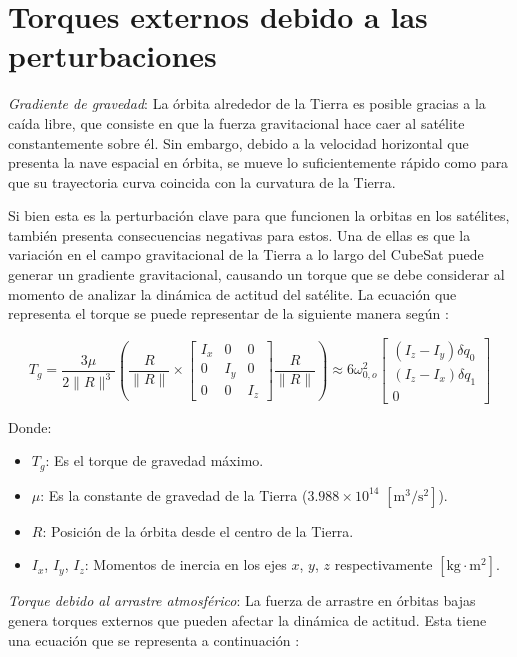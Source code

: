 \section{Torques externos debido a las perturbaciones}

\label{ap:Z2}


\textit{Gradiente de gravedad}: La órbita alrededor de la Tierra es posible gracias a la caída libre, que consiste en que la fuerza gravitacional hace caer al satélite constantemente sobre él. Sin embargo, debido a la velocidad horizontal que presenta la nave espacial en órbita, se mueve lo suficientemente rápido como para que su trayectoria curva coincida con la curvatura de la Tierra.

Si bien esta es la perturbación clave para que funcionen la orbitas en los satélites, también presenta consecuencias negativas para estos. Una de ellas es que la variación en el campo gravitacional de la Tierra a lo largo del CubeSat puede generar un gradiente gravitacional, causando un torque que se debe considerar al momento de analizar la dinámica de actitud del satélite. La ecuación que representa el torque se puede representar de la siguiente manera según \cite{ref5}:

\[
T_g = \frac{3\mu}{2\|R\|^3} \left( \frac{R}{\|R\|} \times \left[ \begin{matrix} 
	I_x & 0 & 0 \\ 
	0 & I_y & 0 \\ 
	0 & 0 & I_z 
\end{matrix} \right] \frac{R}{\|R\|} \right) \approx 6 \omega_{0,o}^2 \left[ \begin{matrix} 
	(I_z - I_y) \delta q_0 \\ 
	(I_z - I_x) \delta q_1 \\ 
	0 
\end{matrix} \right]
\]

Donde:
\begin{itemize}
	\item $T_g$: Es el torque de gravedad máximo.
	\item $\mu$: Es la constante de gravedad de la Tierra ($3.988 \times 10^{14}$ $[\text{m}^3/\text{s}^2]$).
	\item $R$: Posición de la órbita desde el centro de la Tierra.
	\item $I_x$, $I_y$, $I_z$: Momentos de inercia en los ejes $x$, $y$, $z$ respectivamente $[\text{kg} \cdot \text{m}^2]$.
\end{itemize}

\textit{Torque debido al arrastre atmosférico}: La fuerza de arrastre en órbitas bajas genera torques externos que pueden afectar la dinámica de actitud. Esta tiene una ecuación que se representa a continuación \cite{ref5}:

